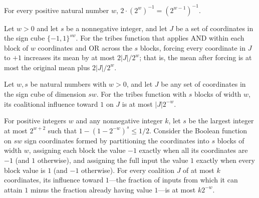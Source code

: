 \begin{theorem}
\label{FABL.two_mul_inv_two_pow_eq_inv_pred_pow}
\leanok
{}
For every positive natural number $w$, $2\cdot(2^w)^{-1}=(2^{w-1})^{-1}$.
\end{theorem}

\begin{theorem}
\label{FABL.mean_bribeFunction_tribes_one_sub_mean_le}
\leanok
{}
Let $w>0$ and let $s$ be a nonnegative integer, and let $J$ be a set of coordinates in
the sign cube $\{-1,1\}^{sw}$. For the tribes function that applies AND within
each block of $w$ coordinates and OR across the $s$ blocks, forcing every coordinate in
$J$ to $+1$ increases its mean by at most $2|J|/2^w$; that is, the mean after forcing is
at most the original mean plus $2|J|/2^w$.
\end{theorem}

\begin{theorem}
\label{FABL.coalitionalInfluenceToward_tribes_one_le_card_mul_inv_pow}
\leanok
{}
Let $w,s$ be natural numbers with $w>0$, and let $J$ be any set of coordinates in the
sign cube of dimension $sw$. For the tribes function with $s$ blocks of width $w$, its
coalitional influence toward $1$ on $J$ is at most $|J|2^{-w}$.
\end{theorem}

\begin{theorem}
\label{FABL.coalitionalInfluenceToward_criticalTribes_one_le}
\leanok
{}
For positive integers $w$ and any nonnegative integer $k$, let $s$ be the largest
integer at most $2^{w+2}$ such that $1-(1-2^{-w})^s\le 1/2$. Consider the Boolean
function on $sw$ sign coordinates formed by partitioning the coordinates into $s$ blocks
of width $w$, assigning each block the value $-1$ exactly when all its coordinates are
$-1$ (and $1$ otherwise), and assigning the full input the value $1$ exactly when every
block value is $1$ (and $-1$ otherwise). For every coalition $J$ of at most $k$
coordinates, its influence toward $1$—the fraction of inputs from which it can attain
$1$ minus the fraction already having value $1$—is at most $k2^{-w}$.
\end{theorem}

